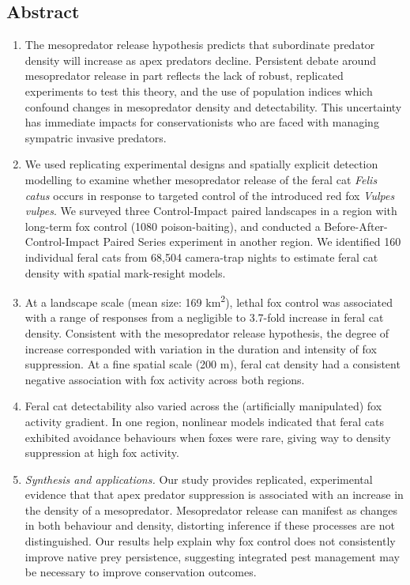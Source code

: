 \documentclass[11pt,a4paper,titlepage,twoside,openright]{style/unimelbthesis}
\begin{document}
\begin{mainmatter}
{\section*{Abstract}\label{abstract-3}}
\begin{enumerate}
\def\labelenumi{\arabic{enumi}.}
\item
  The mesopredator release hypothesis predicts that subordinate predator density will increase as apex predators decline. Persistent debate around mesopredator release in part reflects the lack of robust, replicated experiments to test this theory, and the use of population indices which confound changes in mesopredator density and detectability. This uncertainty has immediate impacts for conservationists who are faced with managing sympatric invasive predators.
\item
  We used replicating experimental designs and spatially explicit detection modelling to examine whether mesopredator release of the feral cat \emph{Felis catus} occurs in response to targeted control of the introduced red fox \emph{Vulpes vulpes}. We surveyed three Control-Impact paired landscapes in a region with long-term fox control (1080 poison-baiting), and conducted a Before-After-Control-Impact Paired Series experiment in another region. We identified 160 individual feral cats from 68,504 camera-trap nights to estimate feral cat density with spatial mark-resight models.
\item
  At a landscape scale (mean size: 169 km\textsuperscript{2}), lethal fox control was associated with a range of responses from a negligible to 3.7-fold increase in feral cat density. Consistent with the mesopredator release hypothesis, the degree of increase corresponded with variation in the duration and intensity of fox suppression. At a fine spatial scale (200 m), feral cat density had a consistent negative association with fox activity across both regions.
\item
  Feral cat detectability also varied across the (artificially manipulated) fox activity gradient. In one region, nonlinear models indicated that feral cats exhibited avoidance behaviours when foxes were rare, giving way to density suppression at high fox activity.
\item
  \emph{Synthesis and applications.} Our study provides replicated, experimental evidence that that apex predator suppression is associated with an increase in the density of a mesopredator. Mesopredator release can manifest as changes in both behaviour and density, distorting inference if these processes are not distinguished. Our results help explain why fox control does not consistently improve native prey persistence, suggesting integrated pest management may be necessary to improve conservation outcomes.
\end{enumerate}
\newpage


\end{mainmatter}
\end{document}
